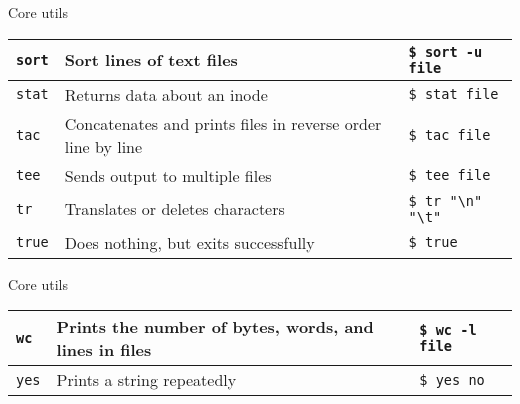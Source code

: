 \documentclass{beamer}
\let\tt\texttt
\begin{document}
\begin{frame}{Core utils}
        \begin{tabular}{p{} p{} p{}}
                \hline
                \tt{sort}             &
                Sort lines of text files  &
                \tt{\$ sort -u file}       \\
                \hline
                \tt{stat}             &
                Returns data about an inode &
                \tt{\$ stat file}       \\
                \hline
                \tt{tac}             &
                Concatenates and prints files in reverse order line by line &
                \tt{\$ tac file}       \\
                \hline
                \tt{tee}             &
                Sends output to multiple files &
                \tt{\$ tee file}       \\
                \hline
                \tt{tr}             &
                Translates or deletes characters &
                \tt{\$ tr "{\textbackslash}n" "{\textbackslash}t"}       \\
                \hline
                \tt{true}             &
                Does nothing, but exits successfully &
                \tt{\$ true}       \\
                \hline
        \end{tabular}
\end{frame}

\begin{frame}{Core utils}
        \begin{tabular}{p{} p{} p{}}
                \hline
                \tt{wc}             &
                Prints the number of bytes, words, and lines in files &
                \tt{\$ wc -l file}       \\
                \hline
                \tt{yes}             &
                Prints a string repeatedly &
                \tt{\$ yes no}       \\
                \hline
        \end{tabular}
\end{frame}
\end{document}
